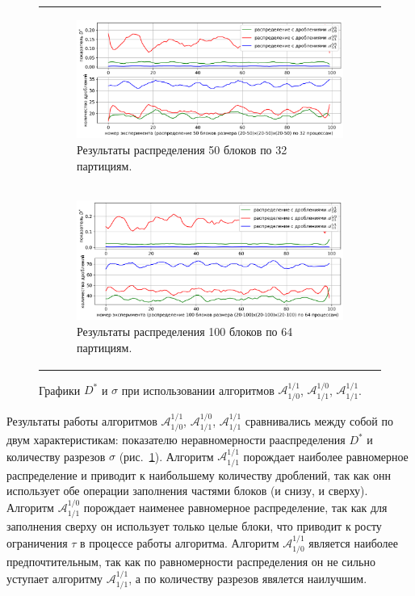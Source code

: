 \documentclass[a4paper,14pt]{extarticle}                     %
\theoremstyle{plain}                                         %
\begin{document}
\begin{figure}[ht]
\centering
\begin{tabular}{l}
\begin{subfigure}{1.0\textwidth}\centering\includegraphics[width=1.0\columnwidth]{fig/par_chart_distr_50_20_50_32.png}\caption{Результаты распределения 50 блоков по 32 партициям.}\end{subfigure} \\
\begin{subfigure}{1.0\textwidth}\centering\includegraphics[width=1.0\columnwidth]{fig/par_chart_distr_100_20_100_64.png}\caption{Результаты распределения 100 блоков по 64 партициям.}\end{subfigure}
\end{tabular}
\singlespacing
\caption{Графики $D^{*}$ и $\sigma$ при использовании алгоритмов $\mathscr{A}_{1/0}^{1/1}$, $\mathscr{A}_{1/1}^{1/0}$, $\mathscr{A}_{1/1}^{1/1}$.}
\label{fig:min_cuts_distr}
\end{figure}

Результаты работы алгоритмов $\mathscr{A}_{1/0}^{1/1}$, $\mathscr{A}_{1/1}^{1/0}$, $\mathscr{A}_{1/1}^{1/1}$ сравнивались между собой по двум характеристикам: показателю неравномерности рааспределения $D^{*}$ и количеству разрезов $\sigma$ (рис.~\ref{fig:min_cuts_distr}).
Алгоритм $\mathscr{A}_{1/1}^{1/1}$ порождает наиболее равномерное распределение и приводит к наибольшему количеству дроблений, так как онн использует обе операции заполнения частями блоков (и снизу, и сверху).
Алгоритм $\mathscr{A}_{1/1}^{1/0}$ порождает наименее равномерное распределение, так как для заполнения сверху он использует только целые блоки, что приводит к росту ограничения $\tau$ в процессе работы алгоритма.
Алгоритм $\mathscr{A}_{1/0}^{1/1}$ является наиболее предпочтительным, так как по равномерности распределения он не сильно уступает алгоритму $\mathscr{A}_{1/1}^{1/1}$, а по количеству разрезов явялется наилучшим.
\end{document}
